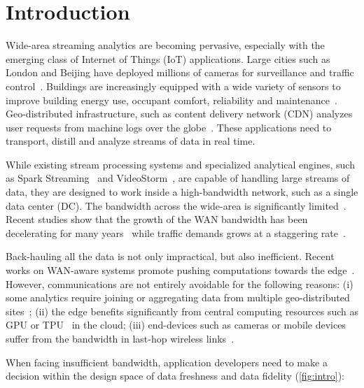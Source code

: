 \section{Introduction}

Wide-area streaming analytics are becoming pervasive, especially with the
emerging class of Internet of Things (IoT) applications.  Large cities such as
London and Beijing have deployed millions of cameras for surveillance and
traffic control~\cite{london.surveillance, skynet}. Buildings are increasingly
equipped with a wide variety of sensors to improve building energy use, occupant
comfort, reliability and
maintenance~\cite{krioukov2012building}. Geo-distributed infrastructure, such as
content delivery network (CDN) analyzes user requests from machine logs over the
globe~\cite{mukerjee2015practical}. These applications need to transport,
distill and analyze streams of data in real time.

While existing stream processing systems and specialized analytical engines,
such as Spark Streaming~\cite{zaharia2013discretized} and
VideoStorm~\cite{zhang2017live}, are capable of handling large streams of data,
they are designed to work inside a high-bandwidth network, such as a single data
center (DC). The bandwidth across the wide-area is significantly
limited~\cite{hsieh17gaia, vulimiri2015global}. Recent studies show that the
growth of the WAN bandwidth has been decelerating for many
years~\cite{global2016telegeography} while traffic demands grows at a staggering
rate~\cite{index2013zettabyte}.

Back-hauling all the data is not only impractical, but also inefficient. Recent
works on WAN-aware systems promote pushing computations towards the
edge~\cite{satyanarayanan2009case, rabkin2014aggregation, pu2015low}. However,
communications are not entirely avoidable for the following reasons: (i) some
analytics require joining or aggregating data from multiple geo-distributed
sites~\cite{pu2015low, viswanathan2016clarinet}; (ii) the edge benefits
significantly from central computing resources such as GPU or
TPU~\cite{norm2016google} in the cloud; (iii) end-devices such as cameras or
mobile devices suffer from the bandwidth in last-hop wireless
links~\cite{zhang2015design, abari2017enabling}.


When facing insufficient bandwidth, application developers need to make a
decision within the design space of data freshness and data fidelity
(\autoref{fig:intro}):

